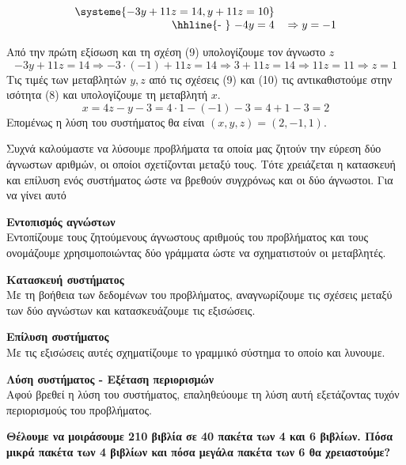 \documentclass[twoside,nofonts,internet,methodoi]{thewria}
\begin{document}
\begin{center}
\vspace{-5mm}
\begin{equation}
\begin{tabular}{rr}
$  \displaystyle\systeme{-3y+11z=14,y+11z=10} $  &  \\ 
\hhline{-~}  $ -4y=4 $ & $ \Rightarrow y=-1 $
\end{tabular}
\end{equation}
\end{center}
Από την πρώτη εξίσωση και τη σχέση (9) υπολογίζουμε τον άγνωστο $ z $
\begin{equation} -3y+11z=14\Rightarrow-3\cdot(-1)+11z=14\Rightarrow3+11z=14\Rightarrow11z=11\Rightarrow z=1 \end{equation}
Τις τιμές των μεταβλητών $ y,z $ από τις σχέσεις (9) και (10) τις αντικαθιστούμε στην ισότητα (8) και υπολογίζουμε τη μεταβλητή $ x $.
\[ x=4z-y-3=4\cdot1-(-1)-3=4+1-3=2 \]
Επομένως η λύση του συστήματος θα είναι $ (x,y,z)=(2,-1,1) $.
\begin{Methodos}
Συχνά καλούμαστε να λύσουμε προβλήματα τα οποία μας ζητούν την εύρεση δύο άγνωστων αριθμών, οι οποίοι σχετίζονται μεταξύ τους. Τότε χρειάζεται η κατασκευή και επίλυση ενός συστήματος ώστε να βρεθούν συγχρόνως και οι δύο άγνωστοι. Για να γίνει αυτό
\begin{bhma}
\item \textbf{Εντοπισμός αγνώστων}\\
Εντοπίζουμε τους ζητούμενους άγνωστους αριθμούς του προβλήματος και τους ονομάζουμε χρησιμοποιώντας δύο γράμματα ώστε να σχηματιστούν οι μεταβλητές.
\item \textbf{Κατασκευή συστήματος}\\
Με τη βοήθεια των δεδομένων του προβλήματος, αναγνωρίζουμε τις σχέσεις μεταξύ των δύο αγνώστων και κατασκευάζουμε τις εξισώσεις.
\item \textbf{Επίλυση συστήματος}\\
Με τις εξισώσεις αυτές σχηματίζουμε το γραμμικό σύστημα το οποίο και λυνουμε.
\item \textbf{Λύση συστήματος - Εξέταση περιορισμών}\\
Αφού βρεθεί η λύση του συστήματος, επαληθεύουμε τη λύση αυτή εξετάζοντας τυχόν περιορισμούς του προβλήματος.
\end{bhma}
\end{Methodos}
\textbf{Θέλουμε να μοιράσουμε 210 βιβλία σε 40 πακέτα των 4 και 6 βιβλίων. Πόσα μικρά πακέτα των 4 βιβλίων και πόσα μεγάλα πακέτα των 6 θα χρειαστούμε?}\\\\
\end{document}
